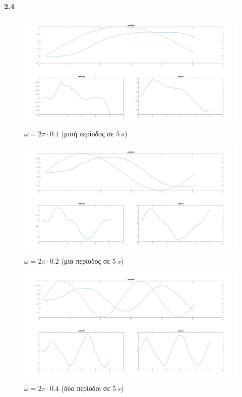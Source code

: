 \documentclass[12pt]{article}
\begin{document}
\textbf{2.4} 
\begin{figure}[H]
    \centering
    \caption*{\(\omega = 2\pi\cdot 0.1\) (μισή περίοδος σε \(\SI{5}{s}\))}
    \includegraphics*[scale=0.25]{lab2d_halfPer_all.jpg}
\end{figure}
\begin{figure}[H]
    \centering
    \caption*{\(\omega = 2\pi\cdot 0.2\) (μία περίοδος σε \(\SI{5}{s}\))}
    \includegraphics*[scale=0.25]{lab2d_onePer_all.jpg}
\end{figure}
\begin{figure}[H]
    \centering
    \caption*{\(\omega = 2\pi\cdot 0.4\) (δύο περίοδοι σε \(\SI{5}{s}\))}
    \includegraphics*[scale=0.25]{lab2d_twoPer_all.jpg}
\end{figure}
\end{document}
